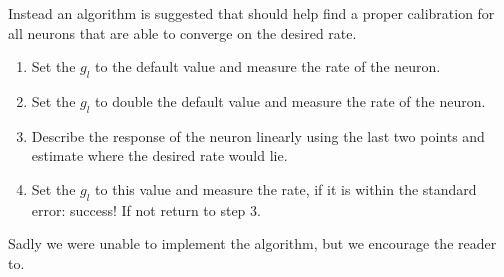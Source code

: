 \documentclass[a4paper,twocolumn]{article}
\begin{document}
Instead an algorithm is suggested that should help find a proper calibration for
all neurons that are able to converge on the desired rate.
\begin{enumerate}
    \item Set the $g_l$ to the default value and measure the rate of the neuron.
    \item Set the $g_l$ to double the default value and measure the rate of the
        neuron.
    \item Describe the response of the neuron linearly using the last two
        points and estimate where the desired rate would lie.
    \item Set the $g_l$ to this value and measure the rate, if it is within the
        standard error: success! If not return to step 3.
\end{enumerate}
Sadly we were unable to implement the algorithm, but we encourage the reader
to.
\end{document}
